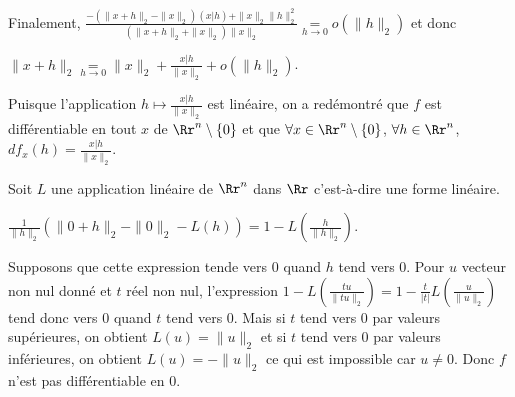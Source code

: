 {{Finalement, $ \frac{-\left(\|x+h\|_2-\|x\|_2\right)(x|h)+\|x\|_2\|h\|_2^2}{\left(\|x+h\|_2+\|x\|_2\right)\|x\|_2}\underset{h\rightarrow0}{=}o(\|h\|_2)$ et donc

\begin{center}
$\|x+h\|_2\underset{h\rightarrow0}{=}\|x\|_2+ \frac{x|h}{\|x\|_2}+o(\|h\|_2)$.
\end{center}

Puisque l'application $h\mapsto \frac{x|h}{\|x\|_2}$ est linéaire, on a redémontré que $f$ est différentiable en tout $x$ de $\Rr^n\setminus\{0\}$ et que $\forall x\in\Rr^n\setminus\{0\}$, $\forall h\in\Rr^n$, $df_x(h)= \frac{x|h}{\|x\|_2}$.

Soit $L$ une application linéaire de $\Rr^n$ dans $\Rr$ c'est-à-dire une forme linéaire.

\begin{center}
$ \frac{1}{\|h\|_2}\left(\|0+h\|_2-\|0\|_2-L(h)\right)=1-L\left( \frac{h}{\|h\|_2}\right)$.
\end{center}

Supposons que cette expression tende vers $0$ quand $h$ tend vers $0$. Pour $u$ vecteur non nul donné et $t$ réel non nul, l'expression $1-L\left( \frac{tu}{\|tu\|_2}\right)=1- \frac{t}{|t|}L\left( \frac{u}{\|u\|_2}\right)$ tend donc vers $0$ quand $t$ tend vers $0$. Mais si $t$ tend vers $0$ par valeurs supérieures, on obtient $L(u)=\|u\|_2$ et si $t$ tend vers $0$ par valeurs inférieures, on obtient $L(u)=-\|u\|_2$ ce qui est impossible car $u\neq0$. Donc $f$ n'est pas différentiable en $0$.}
}